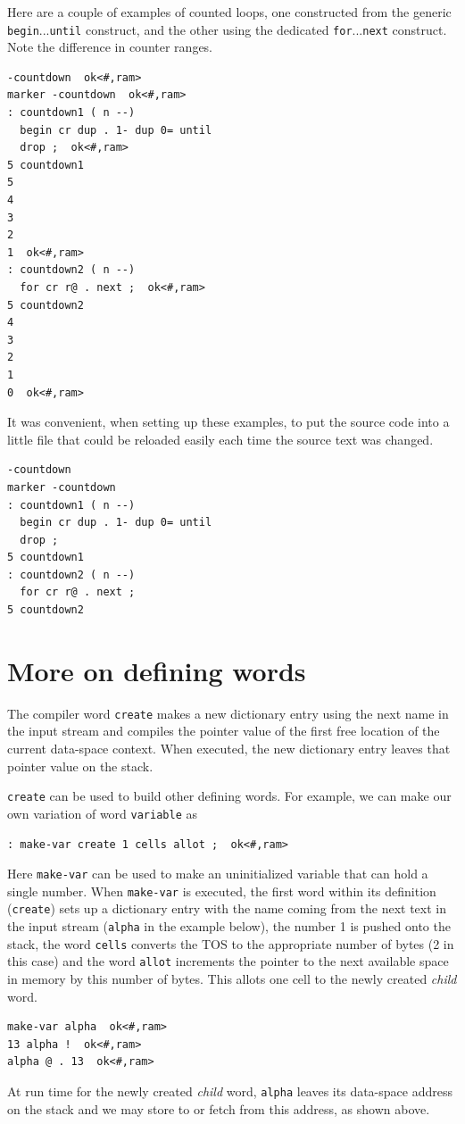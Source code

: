 \documentclass[12pt,a4paper]{article}
\begin{document}
\medskip
Here are a couple of examples of counted loops, 
one constructed from the generic \verb!begin!...\verb!until! construct,
and the other using the dedicated \verb!for!...\verb!next! construct.
Note the difference in counter ranges.
\begin{verbatim}
-countdown  ok<#,ram>
marker -countdown  ok<#,ram>
: countdown1 ( n --) 
  begin cr dup . 1- dup 0= until 
  drop ;  ok<#,ram>
5 countdown1 
5 
4 
3 
2 
1  ok<#,ram>
: countdown2 ( n --) 
  for cr r@ . next ;  ok<#,ram>
5 countdown2 
4 
3 
2 
1 
0  ok<#,ram>
\end{verbatim}
It was convenient, when setting up these examples, to put the source code into a little file
that could be reloaded easily each time the source text was changed.
\begin{verbatim}
-countdown
marker -countdown
: countdown1 ( n --)
  begin cr dup . 1- dup 0= until
  drop ;
5 countdown1
: countdown2 ( n --)
  for cr r@ . next ;
5 countdown2
\end{verbatim}


\newpage
\section{More on defining words}
\label{sec:more-defining-words}
%
The compiler word \verb!create! makes a new dictionary entry 
using the next name in the input stream and compiles the pointer value 
of the first free location of the current data-space context.
When executed, the new dictionary entry leaves that pointer value on the stack.

\medskip
\verb!create! can be used to build other defining words.
For example, we can make our own variation of word \verb!variable! as
\begin{verbatim}
: make-var create 1 cells allot ;  ok<#,ram>
\end{verbatim}
Here \verb!make-var! can be used to make an uninitialized variable that can hold a single number.
When \verb!make-var! is executed, the first word within its definition (\verb!create!)
sets up a dictionary entry with the name coming from the next text in the input stream
(\verb!alpha! in the example below),
the number 1 is pushed onto the stack, the word \verb!cells! converts the TOS to the 
appropriate number of bytes (2 in this case) and the word \verb!allot! increments
the pointer to the next available space in memory by this number of bytes.
This allots one cell to the newly created \textit{child} word.
\begin{verbatim}
make-var alpha  ok<#,ram>
13 alpha !  ok<#,ram>
alpha @ . 13  ok<#,ram>
\end{verbatim}
At run time for the newly created \textit{child} word, \verb!alpha! leaves its data-space address on the stack
and we may store to or fetch from this address, as shown above.
\end{document}
